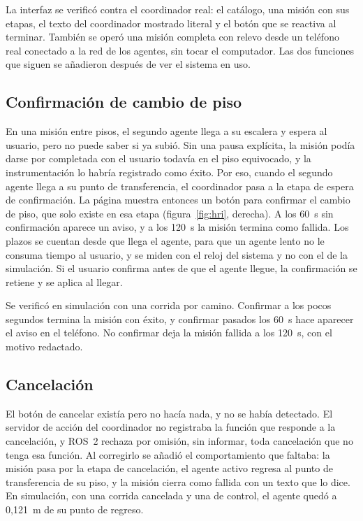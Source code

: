 La interfaz se verificó contra el coordinador real: el catálogo, una misión con
sus etapas, el texto del coordinador mostrado literal y el botón que se reactiva
al terminar. También se operó una misión completa con relevo desde un teléfono
real conectado a la red de los agentes, sin tocar el computador. Las dos
funciones que siguen se añadieron después de ver el sistema en uso.

\subsection{Confirmación de cambio de piso}

En una misión entre pisos, el segundo agente llega a su escalera y espera al
usuario, pero no puede saber si ya subió. Sin una pausa explícita, la
misión podía darse por completada con el usuario todavía en el piso equivocado, y
la instrumentación lo habría registrado como éxito. Por eso, cuando el segundo
agente llega a su punto de transferencia, el coordinador pasa a la etapa de espera de confirmación. La página muestra entonces un botón para confirmar el cambio de
piso, que solo existe en esa etapa (figura~\ref{fig:hri}, derecha). A los 60~s sin
confirmación aparece un aviso, y a los 120~s la misión termina como fallida. Los
plazos se cuentan desde que llega el agente, para que un agente lento no le
consuma tiempo al usuario, y se miden con el reloj del sistema y no con el de la
simulación. Si el usuario confirma antes de que el agente llegue, la
confirmación se retiene y se aplica al llegar.



Se verificó en simulación con una corrida por camino. Confirmar a los pocos segundos termina la misión con éxito, y confirmar pasados los 60~s hace aparecer el aviso en el teléfono. No confirmar deja la misión fallida a los 120~s, con el
motivo redactado.

\subsection{Cancelación}

El botón de cancelar existía pero no hacía nada, y no se había detectado. El
servidor de acción del coordinador no registraba la función que responde a la
cancelación, y ROS~2 rechaza por omisión, sin informar, toda cancelación que no
tenga esa función. Al corregirlo se añadió el comportamiento que faltaba: la
misión pasa por la etapa de cancelación, el agente activo regresa al punto de
transferencia de su piso, y la misión cierra como fallida con un texto que lo
dice. En simulación, con una corrida cancelada y una de control, el agente
quedó a 0,121~m de su punto de regreso.

